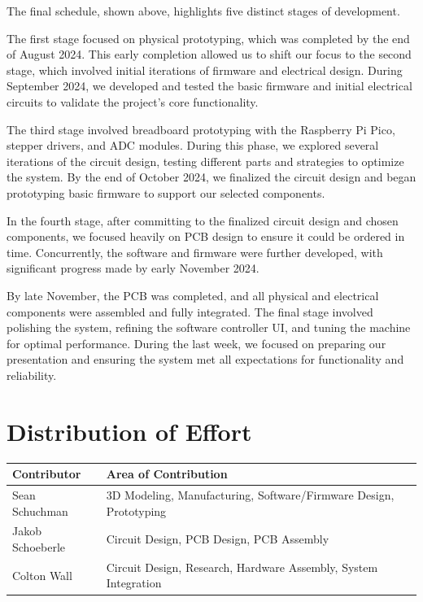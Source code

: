 \vspace{0.5cm}

The final schedule, shown above, highlights five distinct stages of development. 

The first stage focused on physical prototyping, which was completed by the end of August 2024. This early completion allowed us to shift our focus to the second stage, which involved initial iterations of firmware and electrical design. During September 2024, we developed and tested the basic firmware and initial electrical circuits to validate the project's core functionality.

The third stage involved breadboard prototyping with the Raspberry Pi Pico, stepper drivers, and ADC modules. During this phase, we explored several iterations of the circuit design, testing different parts and strategies to optimize the system. By the end of October 2024, we finalized the circuit design and began prototyping basic firmware to support our selected components.

In the fourth stage, after committing to the finalized circuit design and chosen components, we focused heavily on PCB design to ensure it could be ordered in time. Concurrently, the software and firmware were further developed, with significant progress made by early November 2024.

By late November, the PCB was completed, and all physical and electrical components were assembled and fully integrated. The final stage involved polishing the system, refining the software controller UI, and tuning the machine for optimal performance. During the last week, we focused on preparing our presentation and ensuring the system met all expectations for functionality and reliability.



\section{Distribution of Effort}
\begin{tabular}{|l|l|}
    \hline
    Contributor & Area of Contribution \\ \hline
    Sean Schuchman & 3D Modeling, Manufacturing, Software/Firmware Design, Prototyping \\ \hline
    Jakob Schoeberle & Circuit Design, PCB Design, PCB Assembly \\ \hline
    Colton Wall & Circuit Design, Research, Hardware Assembly, System Integration \\ \hline
\end{tabular}

